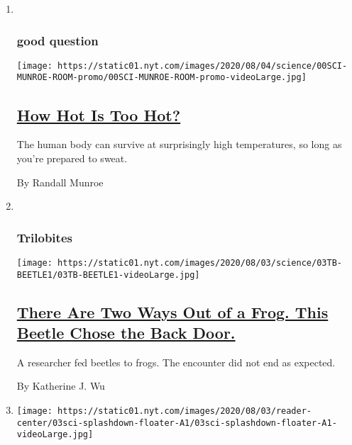 \begin{enumerate}
\def\labelenumi{\arabic{enumi}.}
\item ~
  \hypertarget{good-question}{%
  \subsubsection{good question}\label{good-question}}

  \texttt{[image: https://static01.nyt.com/images/2020/08/04/science/00SCI-MUNROE-ROOM-promo/00SCI-MUNROE-ROOM-promo-videoLarge.jpg]}

  \hypertarget{how-hot-is-too-hot}{%
  \subsection{\texorpdfstring{\href{/2020/08/04/science/randall-munroe-xkcd-temperature.html}{How
  Hot Is Too Hot?}}{How Hot Is Too Hot?}}\label{how-hot-is-too-hot}}

  The human body can survive at surprisingly high temperatures, so long
  as you're prepared to sweat.

  By Randall Munroe
\item ~
  \hypertarget{trilobites-2}{%
  \subsubsection{Trilobites}\label{trilobites-2}}

  \texttt{[image: https://static01.nyt.com/images/2020/08/03/science/03TB-BEETLE1/03TB-BEETLE1-videoLarge.jpg]}

  \hypertarget{there-are-two-ways-out-of-a-frog-this-beetle-chose-the-back-door}{%
  \subsection{\texorpdfstring{\href{/2020/08/03/science/beetle-frog-poop.html}{There
  Are Two Ways Out of a Frog. This Beetle Chose the Back
  Door.}}{There Are Two Ways Out of a Frog. This Beetle Chose the Back Door.}}\label{there-are-two-ways-out-of-a-frog-this-beetle-chose-the-back-door}}

  A researcher fed beetles to frogs. The encounter did not end as
  expected.

  By Katherine J. Wu
\item
  \texttt{[image: https://static01.nyt.com/images/2020/08/03/reader-center/03sci-splashdown-floater-A1/03sci-splashdown-floater-A1-videoLarge.jpg]}


\end{enumerate}
